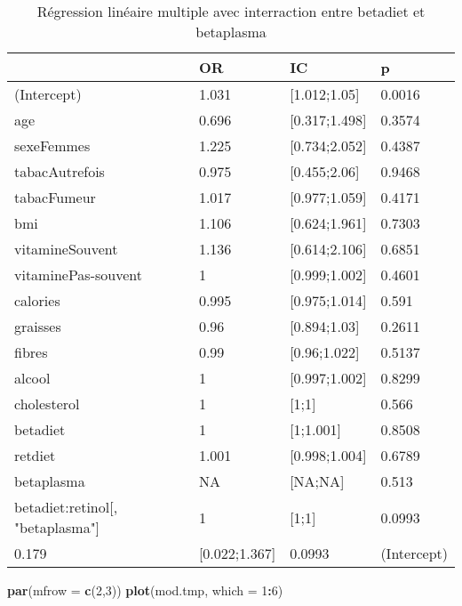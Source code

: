 \documentclass[]{article}
\newenvironment{Shaded}{\begin{snugshade}}{\end{snugshade}}
\newcommand{\KeywordTok}[1]{\textcolor[rgb]{0.13,0.29,0.53}{\textbf{#1}}}
\newcommand{\DataTypeTok}[1]{\textcolor[rgb]{0.13,0.29,0.53}{#1}}
\newcommand{\DecValTok}[1]{\textcolor[rgb]{0.00,0.00,0.81}{#1}}
\newcommand{\OperatorTok}[1]{\textcolor[rgb]{0.81,0.36,0.00}{\textbf{#1}}}
\newcommand{\NormalTok}[1]{#1}
\begin{document}
\begin{table}

\caption{\label{tab:unnamed-chunk-93}Régression linéaire multiple avec interraction entre betadiet et betaplasma}
\centering
\begin{tabular}[t]{l|l|l|l}
\hline
  & OR & IC & p\\
\hline
\rowcolor[HTML]{BBD2E1}  (Intercept) & 1.031 & [1.012;1.05] & 0.0016\\
\hline
age & 0.696 & [0.317;1.498] & 0.3574\\
\hline
\rowcolor[HTML]{BBD2E1}  sexeFemmes & 1.225 & [0.734;2.052] & 0.4387\\
\hline
tabacAutrefois & 0.975 & [0.455;2.06] & 0.9468\\
\hline
\rowcolor[HTML]{BBD2E1}  tabacFumeur & 1.017 & [0.977;1.059] & 0.4171\\
\hline
bmi & 1.106 & [0.624;1.961] & 0.7303\\
\hline
\rowcolor[HTML]{BBD2E1}  vitamineSouvent & 1.136 & [0.614;2.106] & 0.6851\\
\hline
vitaminePas-souvent & 1 & [0.999;1.002] & 0.4601\\
\hline
\rowcolor[HTML]{BBD2E1}  calories & 0.995 & [0.975;1.014] & 0.591\\
\hline
graisses & 0.96 & [0.894;1.03] & 0.2611\\
\hline
\rowcolor[HTML]{BBD2E1}  fibres & 0.99 & [0.96;1.022] & 0.5137\\
\hline
alcool & 1 & [0.997;1.002] & 0.8299\\
\hline
\rowcolor[HTML]{BBD2E1}  cholesterol & 1 & [1;1] & 0.566\\
\hline
betadiet & 1 & [1;1.001] & 0.8508\\
\hline
\rowcolor[HTML]{BBD2E1}  retdiet & 1.001 & [0.998;1.004] & 0.6789\\
\hline
betaplasma & NA & [NA;NA] & 0.513\\
\hline
\rowcolor[HTML]{BBD2E1}  betadiet:retinol[, "betaplasma"] & 1 & [1;1] & 0.0993\\
\hline
0.179 & [0.022;1.367] & 0.0993 & (Intercept)\\
\hline
\end{tabular}
\end{table}

\begin{Shaded}
\begin{Highlighting}[]
\KeywordTok{par}\NormalTok{(}\DataTypeTok{mfrow =} \KeywordTok{c}\NormalTok{(}\DecValTok{2}\NormalTok{,}\DecValTok{3}\NormalTok{))}
\KeywordTok{plot}\NormalTok{(mod.tmp, }\DataTypeTok{which =} \DecValTok{1}\OperatorTok{:}\DecValTok{6}\NormalTok{)}
\end{Highlighting}
\end{Shaded}
\end{document}
